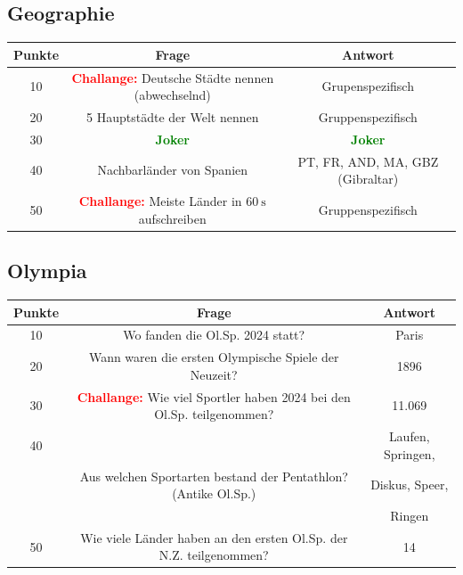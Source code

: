 \documentclass[11pt]{scrartcl}
\begin{document}
\subsection*{Geographie}
\begin{table}[H]
    \begin{tabular}{|c|c|c|}\hline
        \textbf{Punkte}&\textbf{Frage}&\textbf{Antwort}\\\hline
        10&\textcolor{red}{\textbf{Challange:}} Deutsche Städte nennen (abwechselnd)&Grupenspezifisch\\\hline
        20&5 Hauptstädte der Welt nennen&Gruppenspezifisch\\\hline
        30&\textcolor{green}{\textbf{Joker}}&\textcolor{green}{\textbf{Joker}}\\\hline
        40&Nachbarländer von Spanien &PT, FR, AND, MA, GBZ (Gibraltar)\\\hline
        50&\textcolor{red}{\textbf{Challange:}} Meiste Länder in $\qty{60}{\second}$ aufschreiben&Gruppenspezifisch\\\hline
    \end{tabular}
\end{table}
\subsection*{Olympia}
\begin{table}[H]
    \begin{tabular}{|c|c|c|}\hline
        \textbf{Punkte}&\textbf{Frage}&\textbf{Antwort}\\\hline
        10&Wo fanden die Ol.Sp. 2024 statt?&Paris\\\hline
        20&Wann waren die ersten Olympische Spiele der Neuzeit?&1896\\\hline
        30&\textcolor{red}{\textbf{Challange:}} Wie viel Sportler haben 2024 bei den Ol.Sp. teilgenommen?&\num{11.069}\\\hline
        40& &Laufen, Springen,\\ &Aus welchen Sportarten bestand der Pentathlon? (Antike Ol.Sp.)&Diskus, Speer,\\ & &Ringen\\\hline
        50&Wie viele Länder haben an den ersten Ol.Sp. der N.Z. teilgenommen?&14\\\hline
    \end{tabular}
\end{table}
\end{document}
